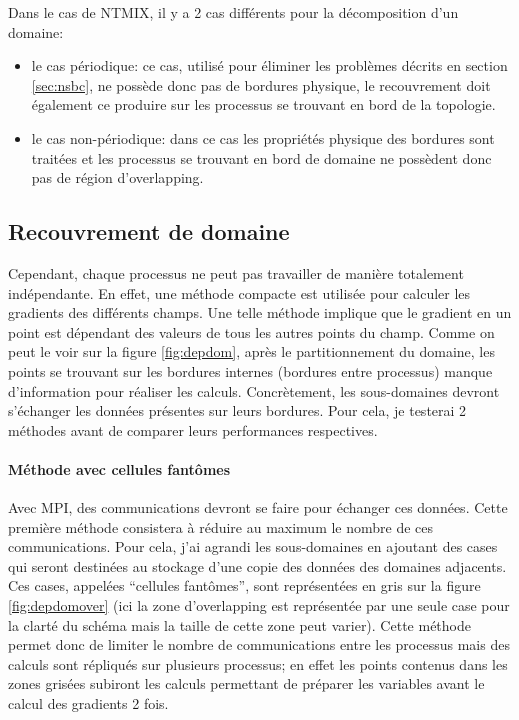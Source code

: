 Dans le cas de NTMIX, il y a 2 cas différents pour la décomposition d'un domaine:
\begin{itemize}
\item le cas périodique: ce cas, utilisé pour éliminer les problèmes décrits en section \ref{sec:nsbc}, ne possède donc pas de bordures physique, le recouvrement doit également ce produire sur les processus se trouvant en bord de la topologie.
\item le cas non-périodique: dans ce cas les propriétés physique des bordures sont traitées et les processus se trouvant en bord de domaine ne possèdent donc pas de région d'overlapping.
\end{itemize}


\subsection{Recouvrement de domaine}
Cependant, chaque processus ne peut pas travailler de manière totalement indépendante. En effet, une méthode compacte est utilisée pour calculer les gradients des différents champs. Une telle méthode implique que le gradient en un point est dépendant des valeurs de tous les autres points du champ. Comme on peut le voir sur la figure \ref{fig:depdom}, après le partitionnement du domaine, les points se trouvant sur les bordures internes (bordures entre processus) manque d'information pour réaliser les calculs. Concrètement, les sous-domaines devront s'échanger les données présentes sur leurs bordures. Pour cela, je testerai 2 méthodes avant de comparer leurs performances respectives.

\paragraph{Méthode avec cellules fantômes}
 Avec MPI, des communications devront se faire pour échanger ces données. Cette première méthode consistera à réduire au maximum le nombre de ces communications. Pour cela, j'ai agrandi les sous-domaines en ajoutant des cases qui seront destinées au stockage d'une copie des données des domaines adjacents. Ces cases, appelées ``cellules fantômes'', sont représentées en gris sur la figure \ref{fig:depdomover} (ici la zone d'overlapping est représentée par une seule case pour la clarté du schéma mais la taille de cette zone peut varier).
Cette méthode permet donc de limiter le nombre de communications entre les processus mais des calculs sont répliqués sur plusieurs processus; en effet les points contenus dans les zones grisées subiront les calculs permettant de préparer les variables avant le calcul des gradients 2 fois.



